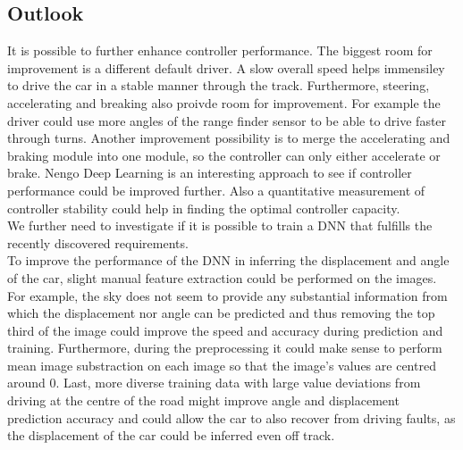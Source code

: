 \documentclass[10pt,a4paper,twoside,journal]{IEEEtran}
\begin{document}
\subsection{Outlook}
\label{ssc:outlook}
It is possible to further enhance controller performance. The biggest room for improvement is a different default driver. A slow overall speed helps immensiley to drive the car in a stable manner through the track. Furthermore, steering, accelerating and breaking also proivde room for improvement. For example the driver could use more angles of the range finder sensor to be able to drive faster through turns. Another improvement possibility is to merge the accelerating and braking module into one module, so the controller can only either accelerate or brake. Nengo Deep Learning is an interesting approach to see if controller performance could be improved further. Also a quantitative measurement of controller stability could help in finding the optimal controller capacity. \\
We further need to investigate if it is possible to train a DNN that fulfills the recently discovered requirements. \\
To improve the performance of the DNN in inferring the displacement and angle of the car, slight manual feature extraction could be performed on the images. For example, the sky does not seem to provide any substantial information from which the displacement nor angle can be predicted and thus removing the top third of the image could improve the speed and accuracy during prediction and training. Furthermore, during the preprocessing it could make sense to perform mean image substraction on each image so that the image's values are centred around 0. Last, more diverse training data with large value deviations from driving at the centre of the road might improve angle and displacement prediction accuracy and could allow the car to also recover from driving faults, as the displacement of the car could be inferred even off track. 



\end{document}
